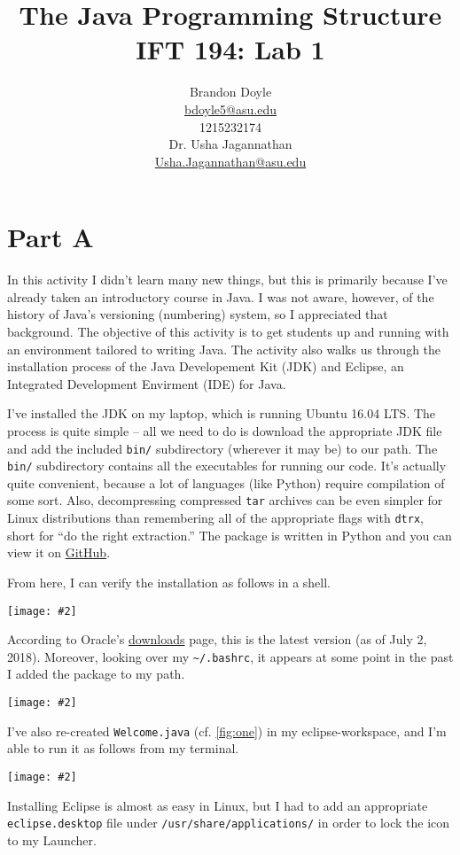 \documentclass[leqno, 11pt]{article}
\title{\vspace{6ex}The Java Programming Structure\\
  \Large IFT 194: Lab 1}
\author{Brandon Doyle\\
\href{mailto:bdoyle@asu.edu}{bdoyle5\mbox{}{\fontfamily{ptm}\selectfont @}\mbox{}asu.edu}\\
1215232174\\[1em]
Dr. Usha Jagannathan\\
\href{mailto:Usha.Jagannathan@asu.edu}{Usha.Jagannathan\mbox{}{\fontfamily{ptm}\selectfont @}\mbox{}asu.edu}}
\newcommand{\centeredimage}[2]{%
  \begin{center}
    \texttt{[image: \#2]}
  \end{center}
}
\begin{document}
\begin{titlepage}
\clearpage\maketitle
\thispagestyle{empty}
\end{titlepage}

\section*{Part A}
In this activity I didn't learn many new things, but this is primarily 
because I've already taken an introductory course in Java. I was not aware,
however, of the history of Java's versioning (numbering) system, so I appreciated
that background. The objective of this activity is to get students up and running
with an environment tailored to writing Java. The activity also walks us
through the installation process of the Java Developement Kit (JDK) and Eclipse,
an Integrated Development Envirment (IDE) for Java.

I've installed the JDK on my laptop, which is running Ubuntu 16.04 LTS. The process
is quite simple -- all we need to do is download the appropriate JDK file and add the
included \texttt{bin/} subdirectory (wherever it may be) to our path. The \texttt{bin/}
subdirectory contains all the executables for running our code. It's actually quite convenient, because a lot of languages (like  Python) require compilation of some sort. Also, decompressing compressed \texttt{tar} archives can be even simpler for Linux distributions than remembering all of the appropriate flags with \texttt{dtrx}, short for ``do the right extraction.'' The package is written in Python and you can view it on \href{https://github.com/moonpyk/dtrx}{GitHub}.

From here, I can verify the installation as follows in a shell.
\centeredimage{0.6}{photos/jdk.png}
According to Oracle's \href{http://www.oracle.com/technetwork/java/javase/downloads/index.html}{downloads} page, this is the latest version (as of July 2, 2018). Moreover, looking over my \texttt{\textasciitilde/.bashrc}, it appears at some point in the past I added the package to my path.
\centeredimage{0.6}{photos/path.png}
I've also re-created \texttt{Welcome.java} (cf. \autoref{fig:one}) in my eclipse-workspace, and I'm able to run it as follows from my terminal.
\centeredimage{0.6}{photos/first_program.png}
Installing Eclipse is almost as easy in Linux, but I had to add an appropriate \texttt{eclipse.desktop} file under \texttt{/usr/share/applications/} in order to lock the icon to my Launcher.
\end{document}
